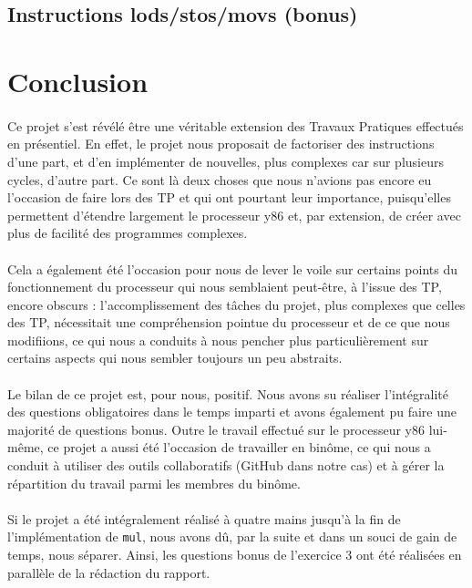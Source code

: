 \documentclass[12pt]{article}
\begin{document}
\subsection{Instructions lods/stos/movs (bonus)}




\section*{Conclusion}
\paragraph{}Ce projet s'est révélé être une véritable extension des Travaux Pratiques effectués en présentiel. En effet, le projet nous proposait de factoriser des instructions d'une part, et d'en implémenter de nouvelles, plus complexes car sur plusieurs cycles, d'autre part. Ce sont là deux choses que nous n'avions pas encore eu l'occasion de faire lors des TP et qui ont pourtant leur importance, puisqu'elles permettent d'étendre largement le processeur y86 et, par extension, de créer avec plus de facilité des programmes complexes.

\paragraph{}Cela a également été l'occasion pour nous de lever le voile sur certains points du fonctionnement du processeur qui nous semblaient peut-être, à l'issue des TP, encore obscurs : l'accomplissement des tâches du projet, plus complexes que celles des TP, nécessitait une compréhension pointue du processeur et de ce que nous modifiions, ce qui nous a conduits à nous pencher plus particulièrement sur certains aspects qui nous sembler toujours un peu abstraits.

\paragraph{}Le bilan de ce projet est, pour nous, positif. Nous avons su réaliser l'intégralité des questions obligatoires dans le temps imparti et avons également pu faire une majorité de questions bonus. Outre le travail effectué sur le processeur y86 lui-même, ce projet a aussi été l'occasion de travailler en binôme, ce qui nous a conduit à utiliser des outils collaboratifs (GitHub dans notre cas) et à gérer la répartition du travail parmi les membres du binôme.

\paragraph{}Si le projet a été intégralement réalisé à quatre mains jusqu'à la fin de l'implémentation de \verb+mul+, nous avons dû, par la suite et dans un souci de gain de temps, nous séparer. Ainsi, les questions bonus de l'exercice 3 ont été réalisées en parallèle de la rédaction du rapport.
\end{document}
